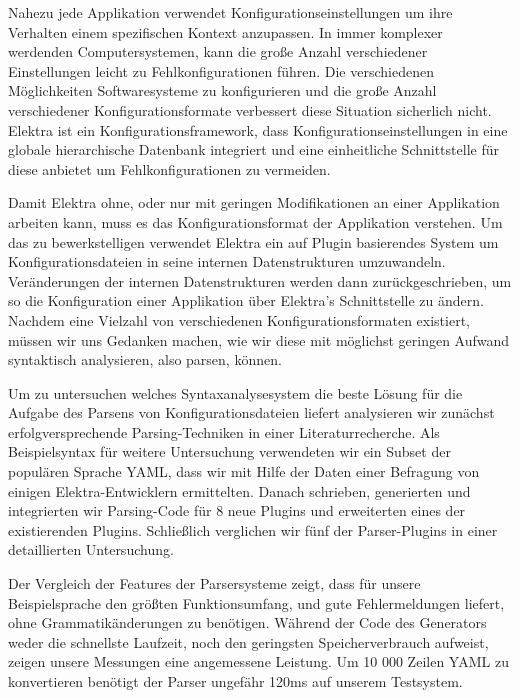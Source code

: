 \begin{kurzfassung}
\begin{sloppypar}
Nahezu jede Applikation verwendet Konfigurationseinstellungen um ihre Verhalten einem spezifischen Kontext anzupassen. In immer komplexer werdenden Computersystemen, kann die große Anzahl verschiedener Einstellungen leicht zu Fehlkonfigurationen führen. Die verschiedenen Möglichkeiten Softwaresysteme zu konfigurieren und die große Anzahl verschiedener Konfigurationsformate verbessert diese Situation sicherlich nicht. Elektra ist ein Konfigurationsframework, dass Konfigurationseinstellungen in eine globale hierarchische Datenbank integriert und eine einheitliche Schnittstelle für diese anbietet um Fehlkonfigurationen zu vermeiden.
\end{sloppypar}

Damit Elektra ohne, oder nur mit geringen Modifikationen an einer Applikation arbeiten kann, muss es das Konfigurationsformat der Applikation verstehen. Um das zu bewerkstelligen verwendet Elektra ein auf Plugin basierendes System um Konfigurationsdateien in seine internen Datenstrukturen umzuwandeln. Veränderungen der internen Datenstrukturen werden dann zurückgeschrieben, um so die Konfiguration einer Applikation über Elektra’s Schnittstelle zu ändern. Nachdem eine Vielzahl von verschiedenen Konfigurationsformaten existiert, müssen wir uns Gedanken machen, wie wir diese mit möglichst geringen Aufwand syntaktisch analysieren, also parsen, können.

\begin{sloppypar}
Um zu untersuchen welches Syntaxanalysesystem die beste Lösung für die Aufgabe des Parsens von Konfigurationsdateien liefert analysieren wir zunächst  erfolgversprechende Parsing-Techniken in einer Literaturrecherche. Als Beispielsyntax für weitere Untersuchung verwendeten wir ein Subset der populären Sprache YAML, dass wir mit Hilfe der Daten einer Befragung von einigen Elektra-Entwicklern ermittelten. Danach schrieben, generierten und integrierten wir Parsing-Code für 8 neue Plugins und erweiterten eines der existierenden Plugins. Schließlich verglichen wir fünf der Parser-Plugins in einer detaillierten Untersuchung.
\end{sloppypar}

Der Vergleich der Features der Parsersysteme zeigt, dass für unsere Beispielsprache  den größten Funktionsumfang, und gute Fehlermeldungen liefert, ohne Grammatikänderungen zu benötigen. Während der Code des Generators weder die schnellste Laufzeit, noch den geringsten Speicherverbrauch aufweist, zeigen unsere Messungen eine angemessene Leistung. Um 10 000 Zeilen YAML zu konvertieren benötigt der Parser ungefähr 120ms auf unserem Testsystem.
\end{kurzfassung}

